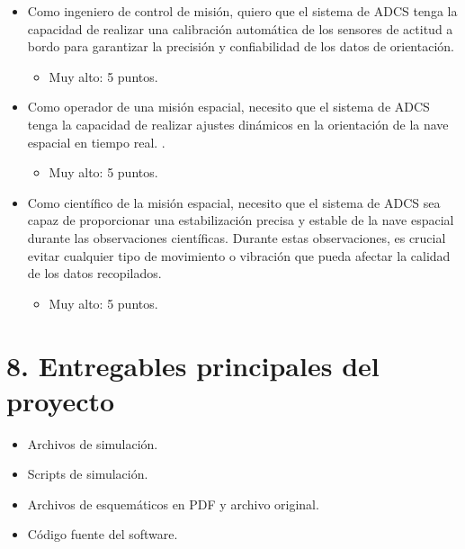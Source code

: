 \documentclass[
11pt, %
]{charter}
\begin{document}
\begin{itemize}

	 \item Como ingeniero de control de misión, quiero que el sistema de ADCS tenga la capacidad de realizar una calibración automática de los sensores de actitud a bordo para garantizar la precisión y confiabilidad de los datos de orientación. 
		\begin{itemize}
			\item Muy alto: 5 puntos.
		\end{itemize}
	
	
	\item Como operador de una misión espacial, necesito que el sistema de ADCS tenga la capacidad de realizar ajustes dinámicos en la orientación de la nave espacial en tiempo real. .
		\begin{itemize}
			\item Muy alto: 5 puntos.
		\end{itemize}
	\item Como científico de la misión espacial, necesito que el sistema de ADCS sea capaz de proporcionar una estabilización precisa y estable de la nave espacial durante las observaciones científicas. Durante estas observaciones, es crucial evitar cualquier tipo de movimiento o vibración que pueda afectar la calidad de los datos recopilados. 
		\begin{itemize}
			\item Muy alto: 5 puntos.
		\end{itemize}
\end{itemize}


\section{8. Entregables principales del proyecto}
\label{sec:entregables}
\begin{itemize}
	\item Archivos de simulación. 
	\item Scripts de simulación. 
	\item Archivos de esquemáticos en PDF y archivo original. 
	\item Código fuente del software. 

\end{itemize}
\end{document}
